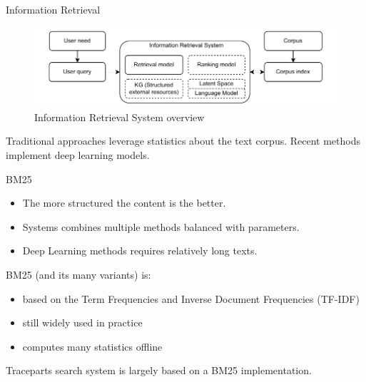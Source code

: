 \begin{frame}{Information Retrieval}
    
    \begin{figure} [H]
        \begin{center}
            \includegraphics[scale=0.8]{images/ir-system-comps.pdf} 
            \caption{Information Retrieval System overview} 
        \end{center}
    \end{figure}

    \begin{center}
        Traditional approaches leverage statistics about the text corpus. Recent methods implement deep learning models.
    \end{center}
    
\end{frame}

\begin{frame}{BM25}

    \begin{itemize}
        \item The more structured the content is the better.
        \item Systems combines multiple methods balanced with parameters.
        \item Deep Learning methods requires relatively long texts.
    \end{itemize}
    
    
    BM25 (and its many variants) is:
    \begin{itemize}
        \item based on the Term Frequencies and Inverse Document Frequencies (TF-IDF)
        \item still widely used in practice
        \item computes many statistics offline
    \end{itemize}

    \begin{center}
        Traceparts search system is largely based on a BM25 implementation.
    \end{center}
    
\end{frame}

